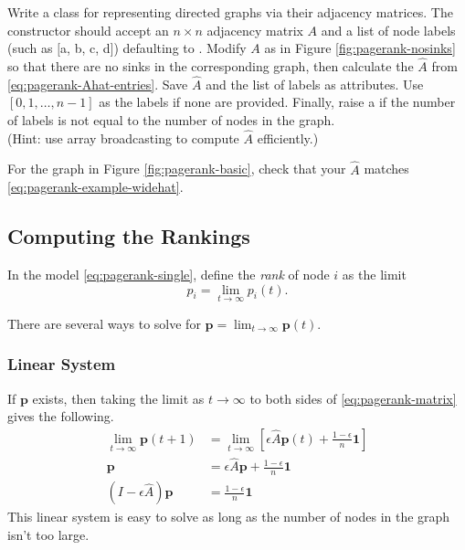\begin{problem} %
Write a class for representing directed graphs via their adjacency matrices.
The constructor should accept an $n\times n$ adjacency matrix $A$ and a list of node labels (such as $[$a, b, c, d$]$) defaulting to .
Modify $A$ as in Figure \ref{fig:pagerank-nosinks} so that there are no sinks in the corresponding graph, then calculate the $\widehat{A}$ from \eqref{eq:pagerank-Ahat-entries}.
Save $\widehat{A}$ and the list of labels as attributes.
Use $[0,1,\ldots,n-1]$ as the labels if none are provided.
Finally, raise a  if the number of labels is not equal to the number of nodes in the graph.
\\(Hint: use array broadcasting to compute $\widehat{A}$ efficiently.)

For the graph in Figure \ref{fig:pagerank-basic}, check that your $\widehat{A}$ matches \eqref{eq:pagerank-example-widehat}.
\label{prob:pagerank-init}
\end{problem}

\subsection*{Computing the Rankings} %

In the model \eqref{eq:pagerank-single}, define the \emph{rank} of node $i$ as the limit
\[
p_i = \lim_{t\to \infty} p_i(t).
\]
\begin{comment} %
For those familiar with Markov Chains, Equation \ref{eq:pagerank-matrix} defines a Markov chain.
Page ranks are simply the steady state of this Markov chain.
\end{comment}
There are several ways to solve for $\mathbf{p} = \lim_{t\rightarrow\infty} \mathbf{p}(t)$.

\subsubsection*{Linear System} %

If $\mathbf{p}$ exists, then taking the limit as $t\rightarrow\infty$ to both sides of \eqref{eq:pagerank-matrix} gives the following.
\begin{align}
\nonumber
\lim_{t\rightarrow\infty}\mathbf{p}(t+1) &= \lim_{t\rightarrow\infty}\left[\epsilon \widehat{A}\mathbf{p}(t) + \frac{1-\epsilon}{n}\mathbf{1}\right] \\
\nonumber
\mathbf{p} &= \epsilon \widehat{A}\mathbf{p} + \frac{1-\epsilon}{n}\mathbf{1} \\
\label{eq:pagerank-algebraic}
\left(I - \epsilon \widehat{A}\right)\mathbf{p} &= \frac{1-\epsilon}{n}\mathbf{1}
\end{align}
This linear system is easy to solve as long as the number of nodes in the graph isn't too large.

